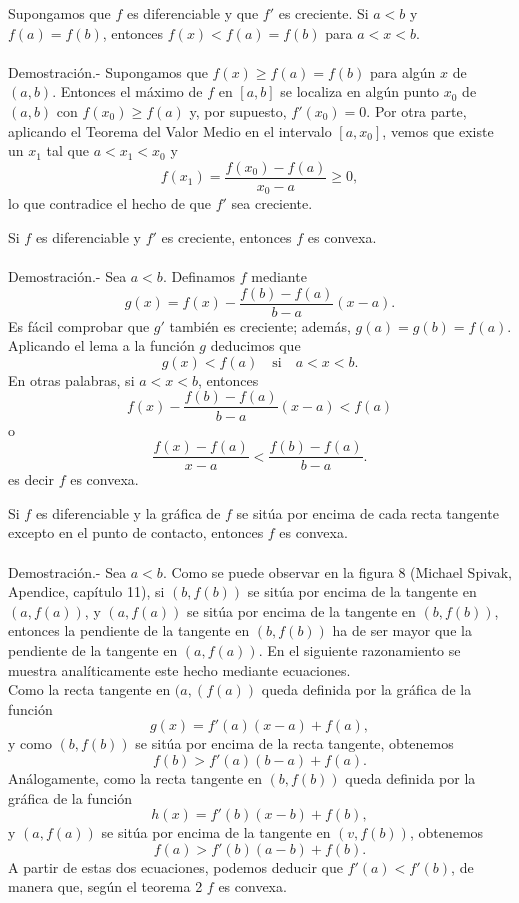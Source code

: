 \begin{lema}
    Supongamos que $f$ es diferenciable y que $f'$ es creciente. Si $a<b$ y $f(a)=f(b)$, entonces $f(x)<f(a)=f(b)$ para $a<x<b$.\\\\
	Demostración.-\; Supongamos que $f(x)\geq f(a)=f(b)$ para algún $x$ de $(a,b)$. Entonces el máximo de $f$ en $[a,b]$ se localiza en algún punto $x_0$ de $(a,b)$ con $f(x_0)\geq f(a)$ y, por supuesto, $f'(x_0)=0$. Por otra parte, aplicando el Teorema del Valor Medio en el intervalo $[a,x_0]$, vemos que existe un $x_1$ tal que $a<x_1<x_0$ y 
	$$f(x_1)=\dfrac{f(x_0)-f(a)}{x_0-a}\geq 0,$$
	lo que contradice el hecho de que $f'$ sea creciente.
\end{lema}

\begin{teo}
    Si $f$ es diferenciable y $f'$ es creciente, entonces $f$ es convexa.\\\\
	Demostración.-\; Sea $a<b$. Definamos $f$ mediante
	$$g(x)=f(x)-\dfrac{f(b)-f(a)}{b-a}(x-a).$$
	Es fácil comprobar que $g'$ también es creciente; además, $g(a)=g(b)=f(a)$. Aplicando el lema a la función $g$ deducimos que
	$$g(x)<f(a)\quad \mbox{si}\quad a<x<b.$$
	En otras palabras, si $a<x<b$, entonces
	$$f(x)-\dfrac{f(b)-f(a)}{b-a}(x-a)<f(a)$$
	o
	$$\dfrac{f(x)-f(a)}{x-a}<\dfrac{f(b)-f(a)}{b-a}.$$
	es decir $f$ es convexa.
\end{teo}

\begin{teo}
    Si $f$ es diferenciable y la gráfica de $f$ se sitúa por encima de cada recta tangente excepto en el punto de contacto, entonces $f$ es convexa.\\\\
	Demostración.-\; Sea $a<b$. Como se puede observar en la figura 8 (Michael Spivak, Apendice, capítulo 11), si $(b,f(b))$ se sitúa por encima de la tangente en $(a,f(a))$, y $(a,f(a))$ se sitúa por encima de la tangente en $(b,f(b))$, entonces la pendiente de la tangente en $(b,f(b))$ ha de ser mayor que la pendiente de la tangente en $(a,f(a))$. En el siguiente razonamiento se muestra analíticamente este hecho mediante ecuaciones.\\
	Como la recta tangente en $(a,(f(a))$ queda definida por la gráfica de la función
	$$g(x)=f'(a)(x-a)+f(a),$$
	y como $(b,f(b))$ se sitúa por encima de la recta tangente, obtenemos
	$$f(b)>f'(a)(b-a)+f(a).$$
	Análogamente, como la recta tangente en $(b,f(b))$ queda definida por la gráfica de la función
	$$h(x)=f'(b)(x-b)+f(b),$$
	y $(a,f(a))$ se sitúa por encima de la tangente en $(v,f(b))$, obtenemos
	$$f(a)>f'(b)(a-b)+f(b).$$
	A partir de estas dos ecuaciones, podemos deducir que $f'(a)<f'(b)$, de manera que, según el teorema 2 $f$ es convexa.
\end{teo}
